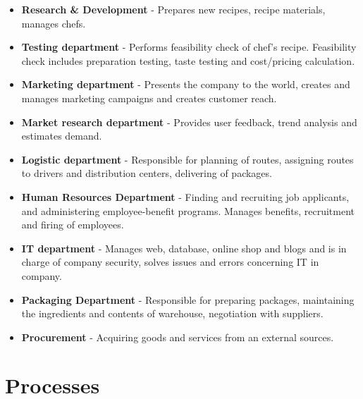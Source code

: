 \documentclass[11pt,a4paper]{article}
\begin{document}
\begin{itemize}
    \item \textbf{Research & Development} - Prepares new recipes, recipe materials, manages chefs.
    \item \textbf{Testing department} - Performs feasibility check of chef’s recipe. Feasibility check includes preparation testing, taste testing and cost/pricing calculation.
    \item \textbf{Marketing department} - Presents the company to the world, creates and manages marketing campaigns and creates customer reach.
    \item \textbf{Market research department} - Provides user feedback, trend analysis and estimates demand.
    \item \textbf{Logistic department} - Responsible for planning of routes, assigning routes to drivers and distribution centers, delivering of packages.
    \item \textbf{Human Resources Department} - Finding and recruiting job applicants, and administering employee-benefit programs. Manages benefits, recruitment and firing of employees.
    \item \textbf{IT department} - Manages web, database, online shop and blogs and is in charge of company security, solves issues and errors concerning IT in company.
    \item \textbf{Packaging Department} - Responsible for preparing packages, maintaining the ingredients and contents of warehouse, negotiation with suppliers.
    \item \textbf{Procurement} - Acquiring goods and services from an external sources.
\end{itemize}

\section{Processes}
\end{document}

